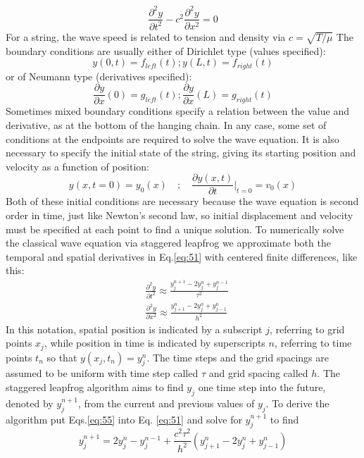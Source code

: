 \begin{equation}\label{eq:51}
	\frac{\partial^2 y}{\partial t^2} - c^2 \frac{\partial^2 y}{\partial x^2} = 0
\end{equation}
For a string, the wave speed is related to tension and density via $c = \sqrt{T / \mu} $ The
boundary conditions are usually either of Dirichlet type (values specified):
\begin{equation}\label{eq:52}
	y(0,t) = f_{left}(t) ; y(L,t) = f_{right}(t)
\end{equation}
or of Neumann type (derivatives specified):
\begin{equation}\label{eq:53}
	\frac{\partial y}{\partial x} (0)  = g_{left}(t) ; \frac{\partial y}{\partial x} (L)  = g_{right}(t)
\end{equation}
Sometimes mixed boundary conditions specify a relation between the value
and derivative, as at the bottom of the hanging chain. In any case, some set of
conditions at the endpoints are required to solve the wave equation. It is also
necessary to specify the initial state of the string, giving its starting position and
velocity as a function of position:
\begin{equation}\label{eq:54}
	y(x,t = 0) = y_0(x) \quad ; \quad \frac{\partial y(x,t)}{\partial t} \vert_{t=0} = v_0 (x)
\end{equation}
Both of these initial conditions are necessary because the wave equation is second
order in time, just like Newton\rq s second law, so initial displacement and velocity
must be specified at each point to find a unique solution.
To numerically solve the classical wave equation via staggered leapfrog we
approximate both the temporal and spatial derivatives in Eq.\ref{eq:51} with centered
finite differences, like this:
\begin{equation}\label{eq:55}
\begin{aligned}
&\frac{\partial^{2} y}{\partial t^{2}} \approx \frac{y_{j}^{n+1}-2 y_{j}^{n}+y_{j}^{n-1}}{\tau^{2}} \\
&\frac{\partial^{2} y}{\partial x^{2}} \approx \frac{y_{j+1}^{n}-2 y_{j}^{n}+y_{j-1}^{n}}{h^{2}}
\end{aligned}
\end{equation}
In this notation, spatial position is indicated by a subscript $j$, referring to grid
points $x_j$, while position in time is indicated by superscripts $n$, referring to time
points $t_n$ so that $y(x_j,t_n) = y_j^n$. The time steps and the grid spacings are assumed to be uniform with time step called
$\tau$ and grid spacing called $h$. The staggered leapfrog algorithm aims to find $y_j$ one time step into the future, denoted by $y_j^{n+1}$,
from the current and previous values of $y_j$. To derive the algorithm put Eqs.\ref{eq:55} into Eq. \ref{eq:51} and solve for $y_j^{n+1}$ to find
\begin{equation}\label{eq:56}
	y_j^{n+1} = 2y_j^n - y_j^{n-1} + \frac{c^2 \tau^2}{h^2}(y_{j+1}^n - 2y^n_j + y^n_{j-1})
\end{equation}

